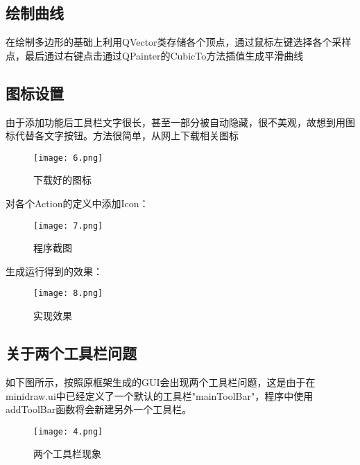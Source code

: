 \documentclass[14pt]{scrartcl} %
\begin{document}
\subsection{绘制曲线}
在绘制多边形的基础上利用QVector类存储各个顶点，通过鼠标左键选择各个采样点，最后通过右键点击通过QPainter的CubicTo方法插值生成平滑曲线

\pagebreak
\subsection{图标设置}
由于添加功能后工具栏文字很长，甚至一部分被自动隐藏，很不美观，故想到用图标代替各文字按钮。方法很简单，从网上下载相关图标
\begin{figure}[h] %
	\centering
	\texttt{[image: 6.png]} %
	\caption{下载好的图标}
\end{figure}

对各个Action的定义中添加Icon：

\begin{figure}[h] %
	\centering
	\texttt{[image: 7.png]} %
	\caption{程序截图}
\end{figure}

生成运行得到的效果：

\begin{figure}[h] %
	\centering
	\texttt{[image: 8.png]} %
	\caption{实现效果}
\end{figure}

\pagebreak
\subsection{关于两个工具栏问题}

如下图所示，按照原框架生成的GUI会出现两个工具栏问题，这是由于在minidraw.ui中已经定义了一个默认的工具栏"mainToolBar"，程序中使用addToolBar函数将会新建另外一个工具栏。

\begin{figure}[h] %
	\centering
	\texttt{[image: 4.png]} %
	\caption{两个工具栏现象}
\end{figure}
\end{document}
